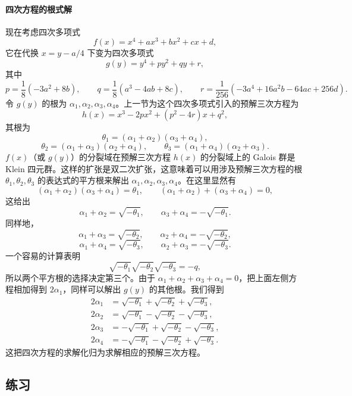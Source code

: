 \paragraph{四次方程的根式解}
现在考虑四次多项式
\[
f(x)=x^4+ax^3+bx^2+cx+d,
\]
它在代换 $x=y-a/4$ 下变为四次多项式
\[
g(y)=y^4+py^2+qy+r,
\]
其中
\[
p=\frac18(-3a^2+8b),
\qquad
q=\frac18(a^3-4ab+8c),
\qquad
r=\frac1{256}(-3a^4+16a^2b-64ac+256d).
\]
令 $g(y)$ 的根为 $\alpha_1,\alpha_2,\alpha_3,\alpha_4$。上一节为这个四次多项式引入的预解三次方程为
\[
h(x)=x^3-2px^2+(p^2-4r)x+q^2,
\]
其根为
\[
\theta_1=(\alpha_1+\alpha_2)(\alpha_3+\alpha_4),
\]
\[
\theta_2=(\alpha_1+\alpha_3)(\alpha_2+\alpha_4),
\qquad
\theta_3=(\alpha_1+\alpha_4)(\alpha_2+\alpha_3).
\]
$f(x)$（或 $g(y)$）的分裂域在预解三次方程 $h(x)$ 的分裂域上的 Galois 群是 Klein 四元群。这样的扩张是双二次扩张，这意味着可以用涉及预解三次方程的根 $\theta_1,\theta_2,\theta_3$ 的表达式的平方根来解出 $\alpha_1,\alpha_2,\alpha_3,\alpha_4$。在这里显然有
\[
(\alpha_1+\alpha_2)(\alpha_3+\alpha_4)=\theta_1,
\qquad
(\alpha_1+\alpha_2)+(\alpha_3+\alpha_4)=0,
\]
这给出
\[
\alpha_1+\alpha_2=\sqrt{-\theta_1},
\qquad
\alpha_3+\alpha_4=-\sqrt{-\theta_1}.
\]
同样地，
\[
\alpha_1+\alpha_3=\sqrt{-\theta_2},
\qquad
\alpha_2+\alpha_4=-\sqrt{-\theta_2},
\]
\[
\alpha_1+\alpha_4=\sqrt{-\theta_3},
\qquad
\alpha_2+\alpha_3=-\sqrt{-\theta_3}.
\]
一个容易的计算表明
\[
\sqrt{-\theta_1}\sqrt{-\theta_2}\sqrt{-\theta_3}=-q,
\]
所以两个平方根的选择决定第三个。由于 $\alpha_1+\alpha_2+\alpha_3+\alpha_4=0$，把上面左侧方程相加得到 $2\alpha_1$，同样可以解出 $g(y)$ 的其他根。我们得到
\[
\begin{aligned}
2\alpha_1&=\sqrt{-\theta_1}+\sqrt{-\theta_2}+\sqrt{-\theta_3},\\
2\alpha_2&=\sqrt{-\theta_1}-\sqrt{-\theta_2}-\sqrt{-\theta_3},\\
2\alpha_3&=-\sqrt{-\theta_1}+\sqrt{-\theta_2}-\sqrt{-\theta_3},\\
2\alpha_4&=-\sqrt{-\theta_1}-\sqrt{-\theta_2}+\sqrt{-\theta_3}.
\end{aligned}
\]
这把四次方程的求解化归为求解相应的预解三次方程。

\subsection*{练习}

